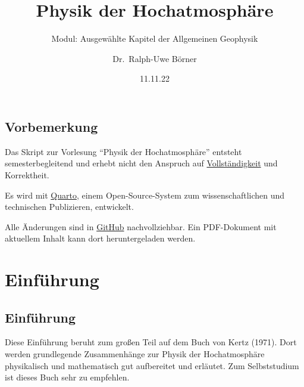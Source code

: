\documentclass[
  a4paper,
  DIV=11]{scrreprt}
\title{Physik der Hochatmosphäre}
\subtitle{Modul: Ausgewählte Kapitel der Allgemeinen Geophysik}
\author{Dr.~Ralph-Uwe Börner}
\date{11.11.22}
\renewcommand*\contentsname{Inhaltsverzeichnis}
\newcommand\contentsname{Inhaltsverzeichnis}
\begin{document}
\maketitle
\ifdefined\Shaded\renewenvironment{Shaded}{\begin{tcolorbox}[boxrule=0pt, enhanced, interior hidden, frame hidden, borderline west={3pt}{0pt}{shadecolor}, breakable, sharp corners]}{\end{tcolorbox}}\fi

\renewcommand*\contentsname{Inhaltsverzeichnis}
{
\hypersetup{linkcolor=}
\setcounter{tocdepth}{2}
\tableofcontents
}

\hypertarget{vorbemerkung}{%
\chapter{Vorbemerkung}\label{vorbemerkung}}

Das Skript zur Vorlesung ``Physik der Hochatmosphäre'' entsteht
semesterbegleitend und erhebt nicht den Anspruch auf
\href{https://imgflip.com/i/6zt09v}{Vollständigkeit} und Korrektheit.

Es wird mit \href{http://quarto.org}{Quarto}, einem Open-Source-System
zum wissenschaftlichen und technischen Publizieren, entwickelt.

Alle Änderungen sind in \href{https://github.com/ruboerner/PDA}{GitHub}
nachvollziehbar. Ein PDF-Dokument mit aktuellem Inhalt kann dort
heruntergeladen werden.

\part{Einführung}

\hypertarget{einfuxfchrung-1}{%
\chapter{Einführung}\label{einfuxfchrung-1}}

Diese Einführung beruht zum großen Teil auf dem Buch von Kertz (1971).
Dort werden grundlegende Zusammenhänge zur Physik der Hochatmosphäre
physikalisch und mathematisch gut aufbereitet und erläutet. Zum
Selbststudium ist dieses Buch sehr zu empfehlen.
\end{document}
